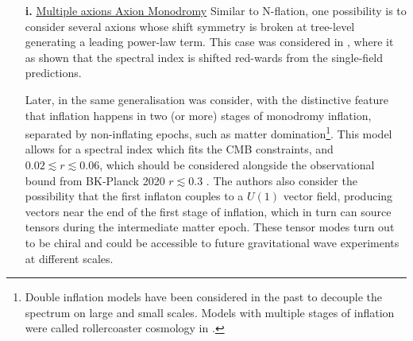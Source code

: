 \begin{enumerate}
\item[{\bf i.}] \underline{ Multiple axions Axion Monodromy}
Similar to N-flation, one possibility is to consider several axions whose  shift symmetry is broken at tree-level generating a leading power-law  term. This case was considered in \cite{Wenren:2014cga}, where it as shown that the spectral index is shifted red-wards from the single-field predictions. 

Later, in \cite{DAmico:2021vka,DAmico:2021fhz} the same generalisation was consider, with the distinctive feature that  inflation happens in two (or more) stages of monodromy inflation,  separated by non-inflating epochs, such as matter domination\footnote{Double inflation models have been considered in the past \cite{Silk:1986vc} to decouple
the spectrum on large and small scales. Models with multiple stages of inflation were called rollercoaster cosmology in \cite{DAmico:2020euu}.}. This model allows for a spectral index  which fits the CMB constraints, and $0.02 \lesssim r \lesssim 0.06$, which should be considered alongside the observational bound from BK-Planck 2020 $r\lesssim 0.3$   \cite{BICEP:2021xfz}. The authors also consider the possibility that the  first inflaton couples to a  $U(1)$ vector field,  producing  vectors near the end of the first stage of inflation, which in turn can source tensors during the intermediate matter epoch. These tensor modes turn out to be chiral and could be accessible to future gravitational wave experiments at different scales.



\end{enumerate}
